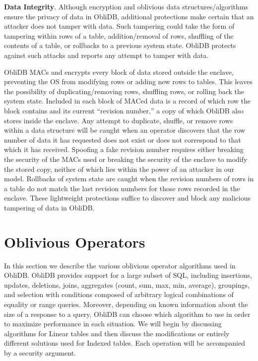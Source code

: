 \documentclass[letterpaper,twocolumn,10pt]{article}
\def\name/{ObliDB}
\begin{document}
 \noindent \textbf{Data Integrity}.
Although encryption and oblivious data structures/algorithms ensure the privacy of data in \name/, additional protections make certain that an attacker does not tamper with data. Such tampering could take the form of tampering within rows of a table, addition/removal of rows, shuffling of the contents of a table, or rollbacks to a previous system state. \name/ protects against such attacks and reports any attempt to tamper with data.

\name/ MACs and encrypts every block of data stored outside the enclave, preventing the OS from modifying rows or adding new rows to tables. This leaves the possibility of duplicating/removing rows, shuffling rows, or rolling back the system state. Included in each block of MACed data is a record of which row the block contains and its current ``revision number,'' a copy of which \name/ also stores inside the enclave. Any attempt to duplicate, shuffle, or remove rows within a data structure will be caught when an operator discovers that the row number of data it has requested does not exist or does not correspond to that which it has received. Spoofing a fake revision number requires either breaking the security of the MACs used or breaking the security of the enclave to modify the stored copy, neither of which lies within the power of an attacker in our model. Rollbacks of system state are caught when the revision numbers of rows in a table do not match the last revision numbers for those rows recorded in the enclave. These lightweight protections suffice to discover and block any malicious tampering of data in \name/.

\section{Oblivious Operators}\label{oblivOps}
In this section we describe the various oblivious operator algorithms used in \name/. \name/ provides support for a large subset of SQL, including insertions, updates, deletions, joins, aggregates (count, sum, max, min, average), groupings, and selection with conditions composed of arbitrary logical combinations of equality or range queries. Moreover, depending on known information about the size of a response to a query, \name/ can choose which algorithm to use in order to maximize performance in each situation. We will begin by discussing algorithms for Linear tables and then discuss the modifications or entirely different solutions used for Indexed tables. Each operation will be accompanied by a security argument.
\end{document}
